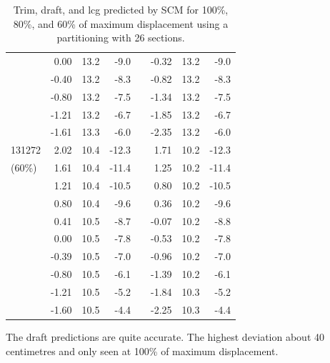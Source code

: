 \documentclass[runningheads]{llncs}
\begin{document}
\begin{table}[h!]
\begin{tabular}{l@{\:\:}rrrc@{\:\:}@{\:\:}rrr}
                &0.00    &13.2    &-9.0  &   &-0.32   &13.2&-9.0   \\
                &-0.40   &13.2    &-8.3  &   &-0.82   &13.2&-8.3   \\
                &-0.80   &13.2    &-7.5  &   &-1.34   &13.2&-7.5   \\
                &-1.21   &13.2    &-6.7  &   &-1.85   &13.2&-6.7   \\
                &-1.61   &13.3    &-6.0  &   &-2.35   &13.2&-6.0   \\
\hline \rule{0pt}{3ex}
131272  &2.02      &10.4    &-12.3  & &1.71    &10.2&-12.3  \\
(60\%)  &1.61    &10.4    &-11.4  & &1.25    &10.2&-11.4  \\
                &1.21    &10.4    &-10.5  & &0.80    &10.2&-10.5  \\
                &0.80    &10.4    &-9.6   &  &0.36    &10.2&-9.6   \\
                &0.41    &10.5    &-8.7   &  &-0.07   &10.2&-8.8   \\
                &0.00    &10.5    &-7.8   &  &-0.53   &10.2&-7.8   \\
                &-0.39   &10.5    &-7.0   &  &-0.96   &10.2&-7.0   \\
                &-0.80   &10.5    &-6.1   &  &-1.39   &10.2&-6.1   \\
                &-1.21   &10.5    &-5.2   &  &-1.84   &10.3&-5.2   \\
                &-1.60   &10.5    &-4.4   &  &-2.25   &10.3&-4.4   \\
\end{tabular}
\caption{Trim, draft, and lcg predicted by SCM for 100\%, 80\%, and 60\% of maximum displacement using a partitioning with 26 sections.}
\label{tbl:variabledips}
\end{table}
The draft predictions are quite accurate. The highest deviation about 40 centimetres and only seen at 100\% of maximum displacement. 
\end{document}
